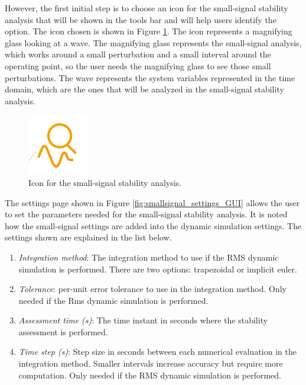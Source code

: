 However, the first initial step is to choose an icon for the small-signal stability analysis that will be shown in the tools bar and will 
help users identify the option. The icon chosen is shown in Figure \ref{fig:small_signal_icon}. The icon represents a magnifying glass 
looking at a wave. The magnifying glass represents the small-signal analysis, which works around a small perturbation and a small interval
around the operating point, so the user needs the magnifying glass to see those small perturbations. The wave represents the system variables
represented in the time domain, which are the ones that will be analyzed in the small-signal stability analysis.

\begin{figure}[H]
  \centering
  \includegraphics[width=0.25\linewidth]{inkscape_svg/small_signal_icon.pdf}
  \caption{Icon for the small-signal stability analysis.}
  \label{fig:small_signal_icon}
\end{figure}

The settings page shown in Figure \ref{fig:smallsignal_settings_GUI} allows the user to set the parameters needed for the small-signal stability analysis.
It is noted how the small-signal settings are added into the dynamic simulation settings. The settings shown are explained in the list below.

\begin{enumerate}
  \item \textit{Integration method}: The integration method to use if the RMS dynamic simulation is performed. There are two options: trapezoidal or implicit euler.
  \item \textit{Tolerance}: per-unit error tolerance to use in the integration method. Only needed if the Rms dynamic simulation is performed.
  \item \textit{Assessment time (s)}: The time instant in seconds where the stability assessment is performed.
  \item \textit{Time step (s)}: Step size in seconds between each numerical evaluation in the integration method. 
  Smaller intervals increase accuracy but require more computation. Only needed if the RMS dynamic simulation is performed.
\end{enumerate}


